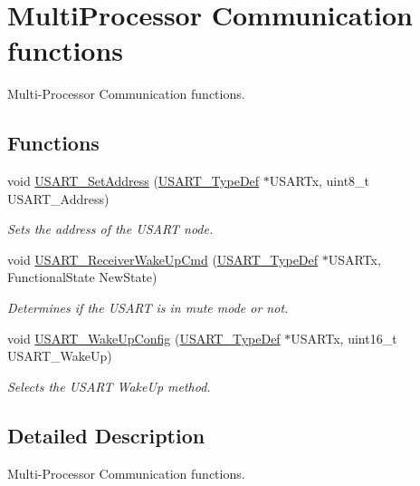 \hypertarget{group___u_s_a_r_t___group3}{}\section{Multi\+Processor Communication functions}
\label{group___u_s_a_r_t___group3}


Multi-\/\+Processor Communication functions.  


\subsection*{Functions}
\begin{DoxyCompactItemize}
\item 
void \hyperlink{group___u_s_a_r_t___group3_ga65ec9928817f3f031dd9a4dfc95d6666}{U\+S\+A\+R\+T\+\_\+\+Set\+Address} (\hyperlink{struct_u_s_a_r_t___type_def}{U\+S\+A\+R\+T\+\_\+\+Type\+Def} $\ast$U\+S\+A\+R\+Tx, uint8\+\_\+t U\+S\+A\+R\+T\+\_\+\+Address)
\begin{DoxyCompactList}\small\item\em Sets the address of the U\+S\+A\+R\+T node. \end{DoxyCompactList}\item 
void \hyperlink{group___u_s_a_r_t___group3_gac27b78ce445a16fe33851d2f87781c02}{U\+S\+A\+R\+T\+\_\+\+Receiver\+Wake\+Up\+Cmd} (\hyperlink{struct_u_s_a_r_t___type_def}{U\+S\+A\+R\+T\+\_\+\+Type\+Def} $\ast$U\+S\+A\+R\+Tx, Functional\+State New\+State)
\begin{DoxyCompactList}\small\item\em Determines if the U\+S\+A\+R\+T is in mute mode or not. \end{DoxyCompactList}\item 
void \hyperlink{group___u_s_a_r_t___group3_ga4965417c2412c36e462fcad50a8d5393}{U\+S\+A\+R\+T\+\_\+\+Wake\+Up\+Config} (\hyperlink{struct_u_s_a_r_t___type_def}{U\+S\+A\+R\+T\+\_\+\+Type\+Def} $\ast$U\+S\+A\+R\+Tx, uint16\+\_\+t U\+S\+A\+R\+T\+\_\+\+Wake\+Up)
\begin{DoxyCompactList}\small\item\em Selects the U\+S\+A\+R\+T Wake\+Up method. \end{DoxyCompactList}\end{DoxyCompactItemize}


\subsection{Detailed Description}
Multi-\/\+Processor Communication functions. 

